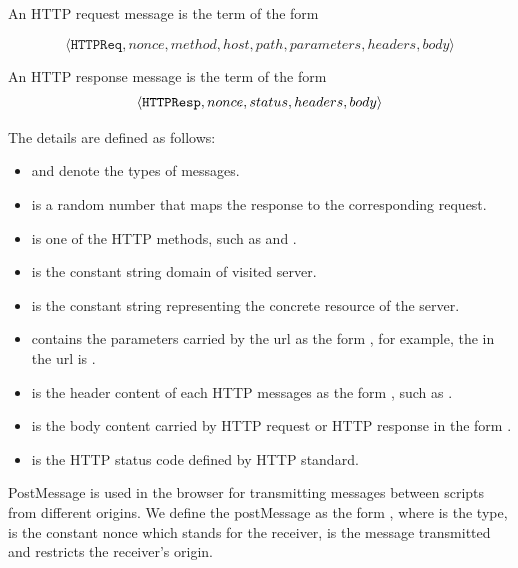 \begin{definition}
An HTTP request message is the term of the form

$$ \langle \mathtt{HTTPReq}, nonce, method, host, path, parameters, headers, body\rangle $$

An HTTP response message is the term of the form
\begin{equation*}
    \langle {{}\mathtt{HTTPResp}, nonce, status, headers, body} \rangle
\end{equation*}

The details are defined as follows:
\begin{itemize}
 \item {} and  denote the types of messages.
 \item {} is a random number that maps the response to the corresponding request.
 \item {} is one of the HTTP methods, such as  and .
 \item {} is the constant string domain of visited server.
 \item {} is the constant string representing the concrete resource of the server.
 \item {} contains the parameters carried by the url as the form , for example, the  in the url   is .
 \item {} is the header content of each HTTP messages as the form , such as  .
 \item {} is the body content carried by HTTP  request or HTTP response in the form .
  \item {} is the HTTP status code defined by HTTP standard.
\end{itemize}

\end{definition}


\begin{definition}[POSTMESSAGEs]
PostMessage is used in the browser for transmitting messages between scripts from different origins. We define the postMessage as the form , where  is the type,  is the constant nonce which stands for the receiver,  is the message transmitted and  restricts the receiver's origin.
\end{definition}

